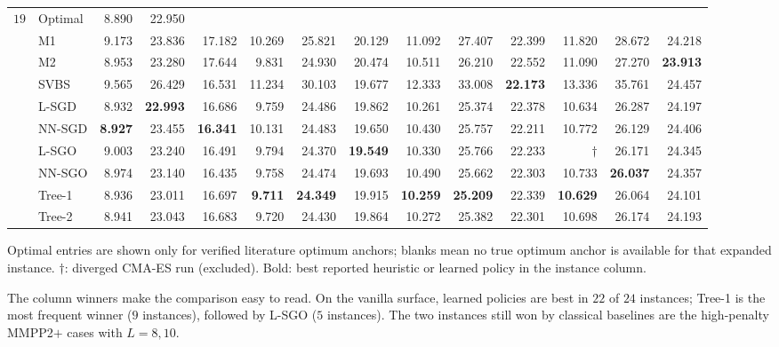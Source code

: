 \documentclass[11pt]{article}
\begin{document}
\begin{table}[!htbp]
{\begin{tabular}{llrrrrrrrrrrrr}
\addlinespace
$19$ & Optimal & 8.890 & 22.950 &  &  &  &  &  &  &  &  &  &  \\
 & M1 & 9.173 & 23.836 & 17.182 & 10.269 & 25.821 & 20.129 & 11.092 & 27.407 & 22.399 & 11.820 & 28.672 & 24.218 \\
 & M2 & 8.953 & 23.280 & 17.644 & 9.831 & 24.930 & 20.474 & 10.511 & 26.210 & 22.552 & 11.090 & 27.270 & \textbf{23.913} \\
 & SVBS & 9.565 & 26.429 & 16.531 & 11.234 & 30.103 & 19.677 & 12.333 & 33.008 & \textbf{22.173} & 13.336 & 35.761 & 24.457 \\
 & L-SGD & 8.932 & \textbf{22.993} & 16.686 & 9.759 & 24.486 & 19.862 & 10.261 & 25.374 & 22.378 & 10.634 & 26.287 & 24.197 \\
 & NN-SGD & \textbf{8.927} & 23.455 & \textbf{16.341} & 10.131 & 24.483 & 19.650 & 10.430 & 25.757 & 22.211 & 10.772 & 26.129 & 24.406 \\
 & L-SGO & 9.003 & 23.240 & 16.491 & 9.794 & 24.370 & \textbf{19.549} & 10.330 & 25.766 & 22.233 & $\dagger$ & 26.171 & 24.345 \\
 & NN-SGO & 8.974 & 23.140 & 16.435 & 9.758 & 24.474 & 19.693 & 10.490 & 25.662 & 22.303 & 10.733 & \textbf{26.037} & 24.357 \\
 & Tree-1 & 8.936 & 23.011 & 16.697 & \textbf{9.711} & \textbf{24.349} & 19.915 & \textbf{10.259} & \textbf{25.209} & 22.339 & \textbf{10.629} & 26.064 & 24.101 \\
 & Tree-2 & 8.941 & 23.043 & 16.683 & 9.720 & 24.430 & 19.864 & 10.272 & 25.382 & 22.301 & 10.698 & 26.174 & 24.193 \\
\bottomrule
\end{tabular}}
\par\medskip\footnotesize Optimal entries are shown only for verified literature optimum anchors; blanks mean no true optimum anchor is available for that expanded instance. $\dagger$: diverged CMA-ES run (excluded). Bold: best reported heuristic or learned policy in the instance column.
\end{table}
\FloatBarrier

The column winners make the comparison easy to read. On the vanilla surface, learned policies are
best in $22$ of $24$ instances; Tree-1 is the most frequent winner ($9$ instances), followed by L-SGO
($5$ instances). The two instances still won by classical baselines are the high-penalty MMPP2$+$
cases with $L=8,10$.
\end{document}
